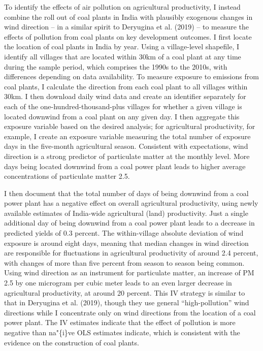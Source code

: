 \documentclass[
]{article}
\begin{document}
To identify the effects of air pollution on agricultural productivity, I instead combine the roll out of coal plants in India with plausibly exogenous changes in wind direction -- in a similar spirit to Deryugina et al. (2019) -- to measure the effects of pollution from coal plants on key development outcomes. I first locate the location of coal plants in India by year. Using a village-level shapefile, I identify all villages that are located within 30km of a coal plant at any time during the sample period, which comprises the 1990s to the 2010s, with differences depending on data availability. To measure exposure to emissions from coal plants, I calculate the direction from each coal plant to all villages within 30km. I then download daily wind data and create an identifier separately for each of the one-hundred-thousand-plus villages for whether a given village is located downwind from a coal plant on any given day. I then aggregate this exposure variable based on the desired analysis; for agricultural productivity, for example, I create an exposure variable measuring the total number of exposure days in the five-month agricultural season. Consistent with expectations, wind direction is a strong predictor of particulate matter at the monthly level. More days being located downwind from a coal power plant leads to higher average concentrations of particulate matter 2.5.

I then document that the total number of days of being downwind from a coal power plant has a negative effect on overall agricultural productivity, using newly available estimates of India-wide agricultural (land) productivity. Just a single additional day of being downwind from a coal power plant leads to a decrease in predicted yields of 0.3 percent. The within-village absolute deviation of wind exposure is around eight days, meaning that median changes in wind direction are responsible for fluctuations in agricultural productivity of around 2.4 percent, with changes of more than five percent from season to season being common. Using wind direction as an instrument for particulate matter, an increase of PM 2.5 by one microgram per cubic meter leads to an even larger decrease in agricultural productivity, at around 20 percent. This IV strategy is similar to that in Deryugina et al. (2019), though they use general ``high-pollution'' wind directions while I concentrate only on wind directions from the location of a coal power plant. The IV estimates indicate that the effect of pollution is more negative than na"\{i\}ve OLS estimates indicate, which is consistent with the evidence on the construction of coal plants.
\end{document}
